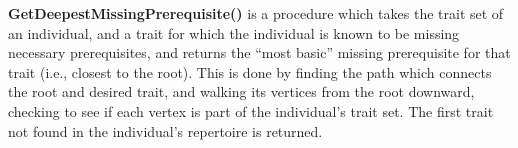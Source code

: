 \textbf{GetDeepestMissingPrerequisite()} is a procedure which takes the trait set of an individual, and a trait for which the individual is known to be missing necessary prerequisites, and returns the ``most basic'' missing prerequisite for that trait (i.e., closest to the root). This is done by finding the path which connects the root and desired trait, and walking its vertices from the root downward, checking to see if each vertex is part of the individual's trait set.  The first trait not found in the individual's repertoire is returned.  





